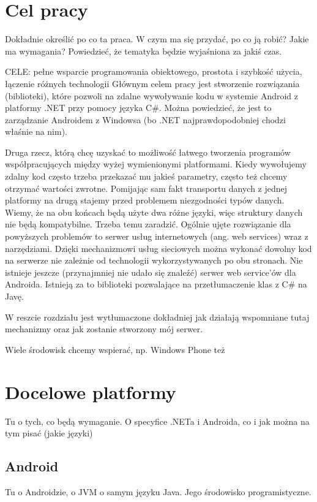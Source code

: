 \documentclass[twoside,a4paper]{book}
\begin{document}
\section{Cel pracy}
Dokładnie określić po co ta praca. W czym ma się przydać, po co ją robić? Jakie ma wymagania?
Powiedzieć, że tematyka będzie wyjaśniona za jakiś czas.

CELE: pełne wsparcie programowania obiektowego, prostota i szybkość użycia, łączenie różnych technologii
Głównym celem pracy jest stworzenie rozwiązania (biblioteki), które pozwoli na zdalne wywoływanie kodu w systemie Android z platformy .NET przy pomocy języka C\#. Można powiedzieć, że jest to zarządzanie Androidem z Windowsa (bo .NET najprawdopodobniej chodzi właśnie na nim).

Druga rzecz, którą chcę uzyskać to możliwość łatwego tworzenia programów współpracujących między wyżej wymienionymi platformami. Kiedy wywołujemy zdalny kod często trzeba przekazać mu jakieś parametry, często też chcemy otrzymać wartości zwrotne. Pomijając sam fakt transportu danych z jednej platformy na drugą stajemy przed problemem niezgodności typów danych. Wiemy, że na obu końcach będą użyte dwa różne języki, więc struktury danych nie będą kompatybilne. Trzeba temu zaradzić.
Ogólnie ujęte rozwiązanie dla powyższych problemów to serwer usług internetowych (ang. web services) wraz z narzędziami. Dzięki mechanizmowi usług sieciowych można wykonać dowolny kod na serwerze nie zależnie od technologii wykorzystywanych po obu stronach. Nie istnieje jeszcze (przynajmniej nie udało się znaleźć) serwer web service’ów dla Androida. Istnieją za to biblioteki pozwalające na przetłumaczenie klas z C\# na Javę.

W reszcie rozdziału jest wytłumaczone dokładniej jak działają wspomniane tutaj mechanizmy oraz jak zostanie stworzony mój serwer.

Wiele środowisk chcemy wspierać, np. Windows Phone też

\section{Docelowe platformy}
Tu o tych, co będą wymaganie. O specyfice .NETa i Androida, co i jak można na tym pisać (jakie języki)

\subsection{Android}
Tu o Androidzie, o JVM o samym języku Java. Jego środowisko programistyczne.
\end{document}
